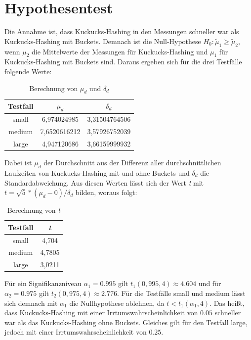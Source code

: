 \section{Hypothesentest}
Die Annahme ist, dass Kuckucks-Hashing in den Messungen schneller war als Kuckucks-Hashing mit Buckets. Demnach ist die Null-Hypothese \(H_{0}: \tilde{\mu}_{1} \ge \tilde{\mu}_{2} \), wenn \(\mu_{2}\) die Mittelwerte der Messungen für Kuckucks-Hashing und \(\mu_{1}\) für Kuckucks-Hashing mit Buckets sind. Daraus ergeben sich für die drei Testfälle folgende Werte:
\begin{table}[H]
	\centering
	\begin{tabular}{|c|c|c|}
		\hline
		Testfall & \(\mu_{d}\) & \(\delta_{d}\) \\ \hline
		small & 6,974024985 & 3,31504764506 \\
		medium & 7,6520616212 & 3,57926752039 \\
		large & 4,947120686 & 3,66159999932 \\ \hline
	\end{tabular}
	\caption{Berechnung von \(\mu_{d}\) und \(\delta_{d}\)}
\end{table}
Dabei ist \(\mu_{d}\) der Durchschnitt aus der Differenz aller durchschnittlichen Laufzeiten von Kuckucks-Hashing mit und ohne Buckets und \(\delta_{d}\) die Standardabweichung. Aus diesen Werten lässt sich der Wert \textit{t} mit \(t=\sqrt{5}*(\mu_{d}-0)/\delta_{d}\) bilden, woraus folgt:
\begin{table}[H]
	\centering
	\begin{tabular}{|c|c|}
		\hline
		Testfall & \textit{t} \\ \hline
		small & 4,704  \\
		medium & 4,7805  \\
		large & 3,0211  \\ \hline
	\end{tabular}
	\caption{Berechnung von \textit{t}}
\end{table}
Für ein Signifikanzniveau \(\alpha_{1} = 0.995\) gilt \(t_{1}(0,995, 4) \approx 4.604\) und für \(\alpha_{2} = 0.975\) gilt \(t_{2}(0,975, 4) \approx 2.776\). Für die Testfälle small und medium lässt sich demnach mit \(\alpha_{1}\) die Nullhypothese ablehnen, da \(t < t_{1}(\alpha_{1}, 4)\). Das heißt, dass Kuckucks-Hashing mit einer Irrtumswahrscheinlichkeit von \(0.05\) schneller war als das Kuckucks-Hashing ohne Buckets. Gleiches gilt für den Testfall large, jedoch mit einer Irrtumswahrscheinlichkeit von \(0.25\).